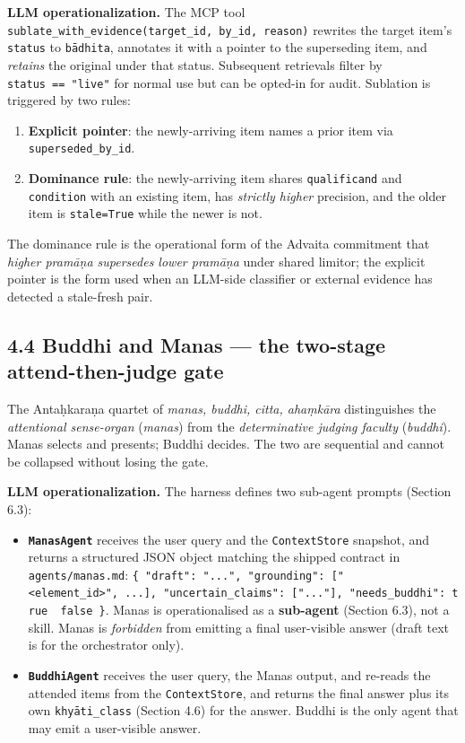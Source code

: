 \textbf{LLM operationalization.} The MCP tool \texttt{sublate\_with\_evidence(target\_id,\ by\_id,\ reason)} rewrites the target item's \texttt{status} to \texttt{bādhita}, annotates it with a pointer to the superseding item, and \emph{retains} the original under that status. Subsequent retrievals filter by \texttt{status\ ==\ "live"} for normal use but can be opted-in for audit. Sublation is triggered by two rules:

\begin{enumerate}
\def\labelenumi{\arabic{enumi}.}
\tightlist
\item
  \textbf{Explicit pointer}: the newly-arriving item names a prior item via \texttt{superseded\_by\_id}.
\item
  \textbf{Dominance rule}: the newly-arriving item shares \texttt{qualificand} and \texttt{condition} with an existing item, has \emph{strictly higher} precision, and the older item is \texttt{stale=True} while the newer is not.
\end{enumerate}

The dominance rule is the operational form of the Advaita commitment that \emph{higher pramāṇa supersedes lower pramāṇa} under shared limitor; the explicit pointer is the form used when an LLM-side classifier or external evidence has detected a stale-fresh pair.

\subsection{4.4 Buddhi and Manas --- the two-stage attend-then-judge gate}\label{buddhi-and-manas-the-two-stage-attend-then-judge-gate}

The Antaḥkaraṇa quartet of \emph{manas, buddhi, citta, ahaṃkāra} \citep{deutsch1969advaita, ramprasad2013advaita, datta1932advaita} distinguishes the \emph{attentional sense-organ} (\emph{manas}) from the \emph{determinative judging faculty} (\emph{buddhi}). Manas selects and presents; Buddhi decides. The two are sequential and cannot be collapsed without losing the gate.

\textbf{LLM operationalization.} The harness defines two sub-agent prompts (Section 6.3):

\begin{itemize}
\tightlist
\item
  \textbf{\texttt{ManasAgent}} receives the user query and the \texttt{ContextStore} snapshot, and returns a structured JSON object matching the shipped contract in \texttt{agents/manas.md}: \texttt{\{\ "draft":\ "...",\ "grounding":\ {[}"\textless{}element\_id\textgreater{}",\ ...{]},\ "uncertain\_claims":\ {[}"..."{]},\ "needs\_buddhi":\ true\ \textbar{}\ false\ \}}. Manas is operationalised as a \textbf{sub-agent} (Section 6.3), not a skill. Manas is \emph{forbidden} from emitting a final user-visible answer (draft text is for the orchestrator only).
\item
  \textbf{\texttt{BuddhiAgent}} receives the user query, the Manas output, and re-reads the attended items from the \texttt{ContextStore}, and returns the final answer plus its own \texttt{khyāti\_class} (Section 4.6) for the answer. Buddhi is the only agent that may emit a user-visible answer.
\end{itemize}

